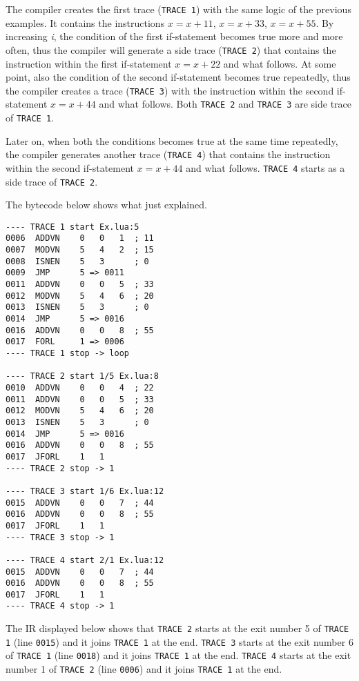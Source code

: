\noindent
The compiler creates the first trace (\texttt{TRACE 1}) with the same logic of the previous examples. It contains the instructions $x=x+11$, $x=x+33$, $x=x+55$. By increasing \textit{i}, the condition of the first if-statement becomes true more and more often, thus the compiler will generate a side trace (\texttt{TRACE 2}) that contains the instruction within the first if-statement $x=x+22$ and what follows. At some point, also the condition of the second if-statement becomes true repeatedly, thus the compiler creates a trace (\texttt{TRACE 3}) with the instruction within the second if-statement $x=x+44$ and what follows. Both \texttt{TRACE 2} and \texttt{TRACE 3} are side trace of \texttt{TRACE 1}.
 
 Later on, when both the conditions becomes true at the same time repeatedly, the compiler generates another trace (\texttt{TRACE 4}) that contains the instruction within the second if-statement $x=x+44$ and what follows. \texttt{TRACE 4} starts as a side trace of \texttt{TRACE 2}.

The bytecode below shows what just explained.

\begin{multicols}{2}
\begin{lstlisting}[style=DumpStyle]
---- TRACE 1 start Ex.lua:5
0006  ADDVN    0   0   1  ; 11
0007  MODVN    5   4   2  ; 15
0008  ISNEN    5   3      ; 0
0009  JMP      5 => 0011
0011  ADDVN    0   0   5  ; 33
0012  MODVN    5   4   6  ; 20
0013  ISNEN    5   3      ; 0
0014  JMP      5 => 0016
0016  ADDVN    0   0   8  ; 55
0017  FORL     1 => 0006
---- TRACE 1 stop -> loop

---- TRACE 2 start 1/5 Ex.lua:8
0010  ADDVN    0   0   4  ; 22
0011  ADDVN    0   0   5  ; 33
0012  MODVN    5   4   6  ; 20
0013  ISNEN    5   3      ; 0
0014  JMP      5 => 0016
0016  ADDVN    0   0   8  ; 55
0017  JFORL    1   1
---- TRACE 2 stop -> 1

---- TRACE 3 start 1/6 Ex.lua:12
0015  ADDVN    0   0   7  ; 44
0016  ADDVN    0   0   8  ; 55
0017  JFORL    1   1
---- TRACE 3 stop -> 1

---- TRACE 4 start 2/1 Ex.lua:12
0015  ADDVN    0   0   7  ; 44
0016  ADDVN    0   0   8  ; 55
0017  JFORL    1   1
---- TRACE 4 stop -> 1
\end{lstlisting}
\end{multicols}

\noindent
The IR displayed below shows that \texttt{TRACE 2} starts at the exit number 5 of \texttt{TRACE 1} (line \texttt{0015}) and it joins \texttt{TRACE 1} at the end. \texttt{TRACE 3} starts at the exit number 6 of \texttt{TRACE 1} (line \texttt{0018}) and it joins \texttt{TRACE 1} at the end. \texttt{TRACE 4} starts at the exit number 1 of \texttt{TRACE 2} (line \texttt{0006}) and it joins \texttt{TRACE 1} at the end. 


